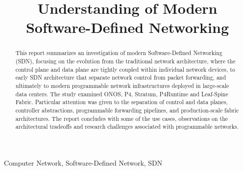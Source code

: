 \documentclass[conference,a4paper]{IEEEtran}
\begin{document}
\title{Understanding of Modern Software-Defined Networking}

\author{
}

\maketitle
\begin{abstract}
    This report summarizes an investigation of modern Software-Defined Networking (SDN), focusing on the evolution from the traditional network architecture, where the control plane and data plane are tightly coupled within individual network devices, to early SDN architecture that separate network control from packet forwarding, and ultimately to modern programmable network infrastructures deployed in large-scale data centers. The study examined ONOS, P4, Stratum, P4Runtime and Leaf-Spine Fabric. Particular attention was given to the separation of control and data planes, controller abstractions, programmable forwarding pipelines, and production-scale fabric architectures. The report concludes with some of the use cases, observations on the architectural tradeoffs and research challenges associated with programmable networks.
\end{abstract}

\begin{IEEEkeywords}
Computer Network, Software-Defined Network, SDN
\end{IEEEkeywords}







% 
% 

\end{document}
